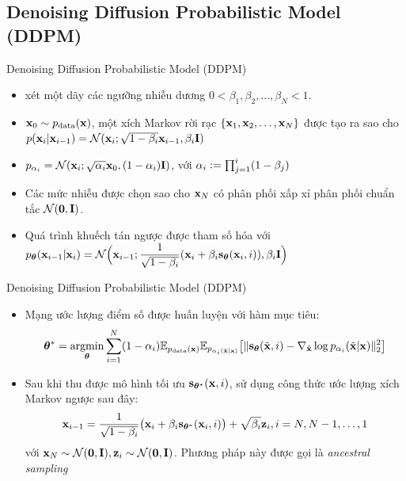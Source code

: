 \documentclass[10pt]{beamer}
\theoremstyle{remark}
\numberwithin{algocf}{section}
\numberwithin{equation}{section}
\numberwithin{dl}{section}
\numberwithin{figure}{section}
\begin{document}
\subsection{Denoising Diffusion Probabilistic Model (DDPM)}

\begin{frame}{Denoising Diffusion Probabilistic Model (DDPM)}
	\begin{itemize}
		\item \citep{sohl2015deep,ho2020denoising} xét một dãy các ngưỡng nhiễu dương $0 < \beta_1, \beta_2, \dots, \beta_N < 1$.
		\item $\bold{x}_0 \sim p_{\mathrm{data}}(\bold{x})$, một xích Markov rời rạc $\lbrace \bold{x}_1, \bold{x}_2, \dots, \bold{x}_N \rbrace$ được tạo ra sao cho $p(\bold{x}_i \vert \bold{x}_{i-1}) = \mathcal{N}(\bold{x}_i; \sqrt{1-\beta_i} \bold{x}_{i-1}, \beta_i \bold{I})$
		\item $p_{\alpha_i}=\mathcal{N}(\bold{x}_i; \sqrt{\alpha_i}\bold{x}_0, (1-\alpha_i)\bold{I})$,
		với $\alpha_i \vcentcolon = \prod_{j=1}^i (1 - \beta_j)$
		\item Các mức nhiễu được chọn sao cho $\bold{x}_N$ có phân phối xấp xỉ phân phối chuẩn tắc $\mathcal{N}(\bold{0}, \bold{I})$.
		\item Quá trình khuếch tán ngược được tham số hóa với $p_{\boldsymbol{\theta}} (\bold{x}_{i-1} \vert \bold{x}_i)=\mathcal{N}\Big(\bold{x}_{i-1}; \dfrac{1}{\sqrt{1-\beta_i}}(\bold{x}_i + \beta_i \bold{s}_{\boldsymbol{\theta}}(\bold{x}_i, i)), \beta_i \bold{I}\Big)$
		
	\end{itemize}
\end{frame}

\begin{frame}{Denoising Diffusion Probabilistic Model (DDPM)}
	\begin{itemize}
		\item Mạng ước lượng điểm số được huấn luyện với hàm mục tiêu:
		\begin{equation} \label{eq:3}
			\boldsymbol{\theta}^{\ast} = \underset{\boldsymbol{\theta}}{\mathrm{argmin}} \sum_{i=1}^N (1 - \alpha_i) \mathbb{E}_{p_{\mathrm{data}}(\bold{x})} \mathbb{E}_{p_{\alpha_i (\tilde{\bold{x}} \vert \bold{x})}} \big \lbrack \lVert \bold{s}_{\boldsymbol{\theta}} (\tilde{\bold{x}}, i) - \nabla_{\tilde{\bold{x}}} \log p_{\alpha_i} (\tilde{\bold{x}} \vert \bold{x}) \rVert_2^2 \big \rbrack
		\end{equation}
		\item Sau khi thu được mô hình tối ưu $\bold{s}_{\boldsymbol{\theta}^{\ast}}(\bold{x}, i)$, sử dụng công thức ước lượng xích Markov ngược sau đây:
		\begin{equation} \label{eq:4}
			\bold{x}_{i-1} = \dfrac{1}{\sqrt{1-\beta_i}} \big( \bold{x}_i + \beta_i \bold{s}_{\boldsymbol{\theta}^{\ast}} (\bold{x}_i, i) \big) + \sqrt{\beta_i} \bold{z}_i, i = N, N-1, \dots, 1
		\end{equation}
		với $\bold{x}_N \sim \mathcal{N}(\bold{0}, \bold{I}), \bold{z}_i \sim \mathcal{N}(\bold{0}, \bold{I})$. Phương pháp này được gọi là \textit{ancestral sampling}
	\end{itemize}
\end{frame}
\end{document}
